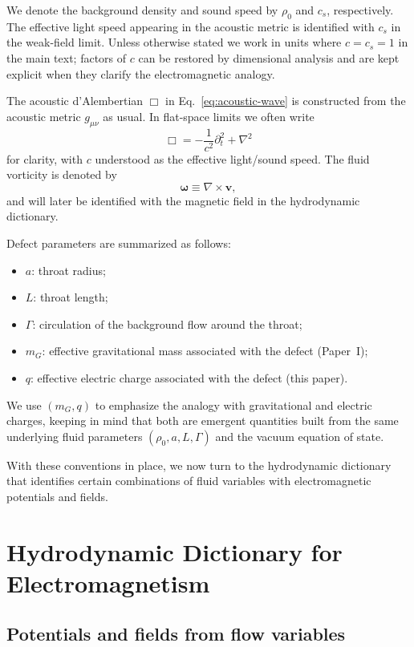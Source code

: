 \documentclass[11pt]{article}
\newcommand{\cS}{c_s}
\newcommand{\Gam}{\Gamma}
\begin{document}
We denote the background density and sound speed by $\rho_0$ and $\cS$, respectively.  The effective light speed appearing in the acoustic metric is identified with $\cS$ in the weak-field limit.  Unless otherwise stated we work in units where $c = \cS = 1$ in the main text; factors of $c$ can be restored by dimensional analysis and are kept explicit when they clarify the electromagnetic analogy.

The acoustic d'Alembertian $\Box$ in Eq.~\eqref{eq:acoustic-wave} is constructed from the acoustic metric $g_{\mu\nu}$ as usual.  In flat-space limits we often write
\begin{equation}
\Box = -\frac{1}{c^2}\partial_t^2 + \nabla^2
\end{equation}
for clarity, with $c$ understood as the effective light/sound speed.  The fluid vorticity is denoted by
\begin{equation}
\boldsymbol{\omega} \equiv \nabla \times \mathbf{v},
\end{equation}
and will later be identified with the magnetic field in the hydrodynamic dictionary.

Defect parameters are summarized as follows:
\begin{itemize}
  \item $a$: throat radius;
  \item $L$: throat length;
  \item $\Gam$: circulation of the background flow around the throat;
  \item $m_G$: effective gravitational mass associated with the defect (Paper~I);
  \item $q$: effective electric charge associated with the defect (this paper).
\end{itemize}
We use $(m_G,q)$ to emphasize the analogy with gravitational and electric charges, keeping in mind that both are emergent quantities built from the same underlying fluid parameters $(\rho_0,a,L,\Gam)$ and the vacuum equation of state.

With these conventions in place, we now turn to the hydrodynamic dictionary that identifies certain combinations of fluid variables with electromagnetic potentials and fields.

\section{Hydrodynamic Dictionary for Electromagnetism}
\label{sec:dictionary}

\subsection{Potentials and fields from flow variables}
\end{document}
